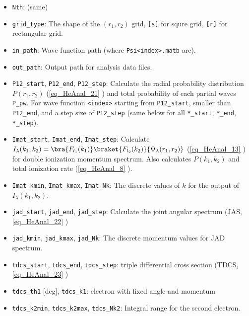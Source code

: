 
\begin{itemize}
\item \verb`Nth`: (same)
\item \verb`grid_type`: The shape of the $(r_1,r_2)$ grid, \verb`[s]` for squre grid, \verb`[r]` for rectangular grid.
\item \verb`in_path`: Wave function path (where \verb`Psi<index>.matb` are).
\item \verb`out_path`: Output path for analysis data files.

\item \verb`P12_start`, \verb`P12_end`, \verb`P12_step`: Calculate the radial probability distribution $P(r_1, r_2)$ (\autoref{eq_HeAnal_21} ) and total probability of each partial waves \verb`P_pw`. For wave function \verb`<index>` starting from \verb`P12_start`, smaller than \verb`P12_end`, and a step size of \verb`P12_step` (same below for all \verb`*_start`, \verb`*_end`, \verb`*_step`).

\item \verb`Imat_start`, \verb`Imat_end`, \verb`Imat_step`: Calculate $I_\lambda(k_1, k_2) = \bra{F_{l_1}(k_1)}\braket{F_{l_2}(k_2)}{\Psi_\lambda(r_1,r_2)}$ (\autoref{eq_HeAnal_13} ) for double ionization momentum spectrum. Also calculates $P(k_1,k_2)$ and total ionization rate (\autoref{eq_HeAnal_8} ).
\item \verb`Imat_kmin`, \verb`Imat_kmax`, \verb`Imat_Nk`: The discrete values of $k$ for the output of $I_\lambda(k_1, k_2)$.
\item \verb`jad_start`, \verb`jad_end`, \verb`jad_step`: Calculate the joint angular spectrum (JAS, \autoref{eq_HeAnal_22} )
\item \verb`jad_kmin`, \verb`jad_kmax`, \verb`jad_Nk`: The discrete momentum values for JAD spectrum.

\item \verb`tdcs_start`, \verb`tdcs_end`, \verb`tdcs_step`: triple differential cross section (TDCS, \autoref{eq_HeAnal_23} )
\item \verb`tdcs_th1` [deg], \verb`tdcs_k1`: electron with fixed angle and momentum
\item \verb`tdcs_k2min`, \verb`tdcs_k2max`, \verb`tdcs_Nk2`: Integral range for the second electron.


\end{itemize}
